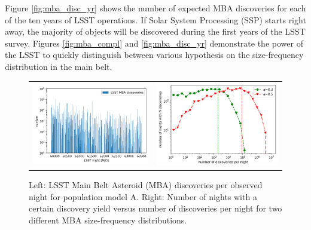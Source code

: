 Figure \ref{fig:mba_disc_yr} shows the number of expected \gls{MBA} discoveries for each of the ten years of \gls{LSST} operations. If Solar System Processing (\gls{SSP}) starts right away, the majority of objects will be discovered during the first years of the \gls{LSST} survey. Figures \ref{fig:mba_compl} and \ref{fig:mba_disc_yr} demonstrate the power of the \gls{LSST} to quickly distinguish between various hypothesis on the size-frequency distribution in the main belt.
%
\begin{figure}[tb!]
\begin{center}
\begin{tabular}{cc}
\includegraphics[width=0.5\linewidth]{figs/disc_per_night.png} &
\includegraphics[width=0.50\linewidth]{figs/disc_stat.png}
\end{tabular}
\end{center}
\caption{Left: \gls{LSST} Main Belt Asteroid (\gls{MBA}) discoveries per observed night for population model A. Right: Number of nights with a certain discovery yield versus number of discoveries per night for two different \gls{MBA} size-frequency distributions.}
\label{fig:mba_disc_stats}       %
\end{figure}

